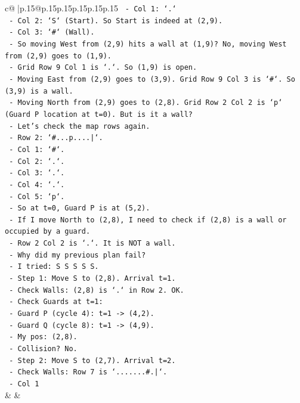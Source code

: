 \documentclass{article}
\begin{document}
{\begin{supertabular}{c@{$\;$}|p{.15\linewidth}@{}p{.15\linewidth}p{.15\linewidth}p{.15\linewidth}p{.15\linewidth}p{.15\linewidth}}
{{{\texttt{    {-} Col 1: `.`} \\
\texttt{    {-} Col 2: `S` (Start). So Start is indeed at (2,9).} \\
\texttt{    {-} Col 3: `\#` (Wall).} \\
\texttt{  {-} So moving West from (2,9) hits a wall at (1,9)? No, moving West from (2,9) goes to (1,9).} \\
\texttt{  {-} Grid Row 9 Col 1 is `.`. So (1,9) is open.} \\
\texttt{  {-} Moving East from (2,9) goes to (3,9). Grid Row 9 Col 3 is `\#`. So (3,9) is a wall.} \\
\texttt{  {-} Moving North from (2,9) goes to (2,8). Grid Row 2 Col 2 is `p` (Guard P location at t=0). But is it a wall?} \\
\texttt{  {-} Let's check the map rows again.} \\
\texttt{  {-} Row 2: `\#...p....|`.} \\
\texttt{    {-} Col 1: `\#`.} \\
\texttt{    {-} Col 2: `.`.} \\
\texttt{    {-} Col 3: `.`.} \\
\texttt{    {-} Col 4: `.`.} \\
\texttt{    {-} Col 5: `p`.} \\
\texttt{  {-} So at t=0, Guard P is at (5,2).} \\
\texttt{  {-} If I move North to (2,8), I need to check if (2,8) is a wall or occupied by a guard.} \\
\texttt{  {-} Row 2 Col 2 is `.`. It is NOT a wall.} \\
\texttt{  {-} Why did my previous plan fail?} \\
\texttt{    {-} I tried: S S S S S.} \\
\texttt{    {-} Step 1: Move S to (2,8). Arrival t=1.} \\
\texttt{      {-} Check Walls: (2,8) is `.` in Row 2. OK.} \\
\texttt{      {-} Check Guards at t=1:} \\
\texttt{        {-} Guard P (cycle 4): t=1 {-}> (4,2).} \\
\texttt{        {-} Guard Q (cycle 8): t=1 {-}> (4,9).} \\
\texttt{      {-} My pos: (2,8).} \\
\texttt{      {-} Collision? No.} \\
\texttt{    {-} Step 2: Move S to (2,7). Arrival t=2.} \\
\texttt{      {-} Check Walls: Row 7 is `.......\#.|`.} \\
\texttt{        {-} Col 1} \\
            }
        }
    }
    & & \\ \\


\end{supertabular}}
\end{document}

